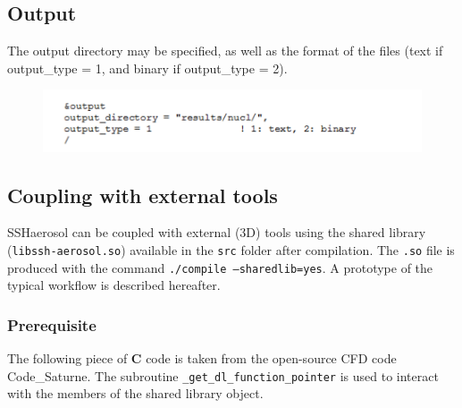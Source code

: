 \documentclass[a4paper,11pt]{article}
\begin{document}
\subsection{Output}

The output directory may be specified, as well as the format of the files (text if output\_type = 1, and binary if output\_type = 2).
 
\begin{figure}[H]
        \begin{center}
                \includegraphics[angle=0,width=\textwidth]{fig/output.png}
        \end{center}
\end{figure}

\subsection{Coupling with external tools}

SSHaerosol can be coupled with external (3D) tools using the shared library (\texttt{libssh-aerosol.so}) available in the \texttt{src} folder after compilation.
The \texttt{.so} file is produced with the command \texttt{./compile --sharedlib=yes}.
A prototype of the typical workflow is described hereafter.

\subsubsection*{Prerequisite}

The following piece of \textbf{C} code is taken from the open-source CFD code Code\_Saturne.
The subroutine \texttt{\_get\_dl\_function\_pointer} is used to interact with the members of the shared library object.
\end{document}

